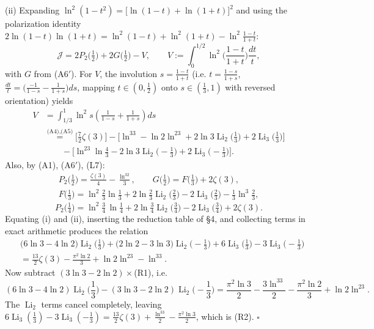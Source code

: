 \documentclass[11pt]{article}
\theoremstyle{remark}
\begin{document}
(ii) Expanding $\ln^2(1-t^2)=\big[\ln(1-t)+\ln(1+t)\big]^2$ and using the polarization identity $2\ln(1-t)\ln(1+t)=\ln^2(1-t)+\ln^2(1+t)-\ln^2\frac{1-t}{1+t}$:
\[
\mathcal J=2P_2\big(\tfrac12\big)+2G\big(\tfrac12\big)-V,\qquad V:=\int_0^{1/2}\ln^2\!\Big(\frac{1-t}{1+t}\Big)\frac{dt}{t},
\]
with $G$ from (A6$'$). For $V$, the involution $s=\frac{1-t}{1+t}$ (i.e. $t=\frac{1-s}{1+s}$, $\frac{dt}{t}=\big(\frac{-1}{1-s}-\frac{1}{1+s}\big)ds$, mapping $t\in(0,\frac12)$ onto $s\in(\frac13,1)$ with reversed orientation) yields
\[
\begin{aligned}
V&=\int_{1/3}^1\ln^2s\left(\frac{1}{1-s}+\frac{1}{1+s}\right)ds\\
&\overset{\text{(A4),(A5)}}{=}\Big[\frac72\zeta(3)\Big]-\Big[\ln^33-\ln2\ln^23+2\ln3\operatorname{Li}_2\big(\tfrac13\big)+2\operatorname{Li}_3\big(\tfrac13\big)\Big]\\
&\qquad-\Big[\ln^23\ln\tfrac43-2\ln3\operatorname{Li}_2\big(-\tfrac13\big)+2\operatorname{Li}_3\big(-\tfrac13\big)\Big].
\end{aligned}
\]
Also, by (A1), (A6$'$), (L7):
\[
\begin{gathered}
P_2\big(\tfrac12\big)=\frac{\zeta(3)}{4}-\frac{\ln^32}{3},\qquad
G\big(\tfrac12\big)=F\big(\tfrac13\big)+2\zeta(3),\\
F\big(\tfrac13\big)=\ln^2\tfrac23\ln\tfrac13+2\ln\tfrac23\operatorname{Li}_2\big(\tfrac23\big)-2\operatorname{Li}_3\big(\tfrac23\big)-\tfrac13\ln^3\tfrac23,
\end{gathered}
\]
\[
P_2\big(\tfrac14\big)=\ln^2\tfrac34\,\ln\tfrac14+2\ln\tfrac34\operatorname{Li}_2\big(\tfrac34\big)-2\operatorname{Li}_3\big(\tfrac34\big)+2\zeta(3).
\]
Equating (i) and (ii), inserting the reduction table of \S4, and collecting terms in exact arithmetic produces the relation
\begin{equation*}
\begin{aligned}
&\big(6\ln3-4\ln2\big)\operatorname{Li}_2\!\Big(\frac13\Big)+\big(2\ln2-3\ln3\big)\operatorname{Li}_2\!\Big(-\frac13\Big)
+6\operatorname{Li}_3\!\Big(\frac13\Big)-3\operatorname{Li}_3\!\Big(-\frac13\Big)\\
&=\frac{13}{2}\zeta(3)-\frac{\pi^2\ln2}{3}+\ln2\ln^23-\ln^33.
\end{aligned}\tag{6.1}
\end{equation*}
Now subtract $(3\ln3-2\ln2)\times$(R1), i.e.
\[
(6\ln3-4\ln2)\operatorname{Li}_2\!\Big(\frac13\Big)-(3\ln3-2\ln2)\operatorname{Li}_2\!\Big(-\frac13\Big)
=\frac{\pi^2\ln3}{2}-\frac{3\ln^33}{2}-\frac{\pi^2\ln2}{3}+\ln2\ln^23 .
\]
The $\operatorname{Li}_2$ terms cancel completely, leaving $6\operatorname{Li}_3(\frac13)-3\operatorname{Li}_3(-\frac13)=\frac{13}{2}\zeta(3)+\frac{\ln^33}{2}-\frac{\pi^2\ln3}{2}$, which is (R2). $\square$
\end{document}
